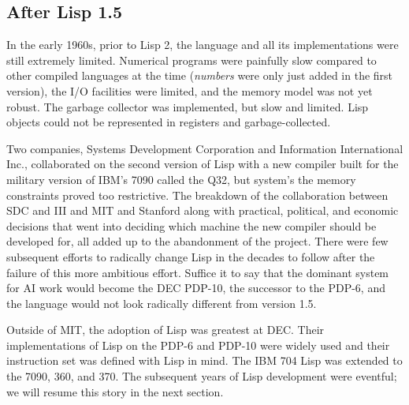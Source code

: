 \subsection{After Lisp 1.5}

In the early 1960s, prior to Lisp 2, the language and all its implementations were still
extremely limited.
Numerical programs were painfully slow compared to other compiled languages at
the time (\textit{numbers} were only just added in the first version), the I/O
facilities were limited, and the memory model was not yet robust.
The garbage collector was implemented, but slow and limited.
Lisp objects could not be represented in registers and garbage-collected.

Two companies, Systems Development Corporation and Information International Inc.,
collaborated on the second version of Lisp with a new compiler
built for the military version of IBM's 7090 called the Q32, but system's the memory constraints
proved too restrictive.
The breakdown of the collaboration between SDC and III and MIT and Stanford along
with practical, political, and economic decisions that went into deciding which machine
the new compiler should be developed for, all added up to the abandonment of the project.
There were few subsequent efforts to radically change Lisp in the decades to follow
after the failure of this more ambitious effort.
Suffice it to say that the dominant system for AI work would become the DEC PDP-10, the
successor to the PDP-6, and the language would not look radically different from
version 1.5.

Outside of MIT, the adoption of Lisp was greatest at DEC.
Their implementations of Lisp on the PDP-6 and PDP-10 were widely used and their
instruction set was defined with Lisp in mind\cite{mccarthy_history_of_lisp_1978}.
The IBM 704 Lisp was extended to the 7090, 360, and 370.
The subsequent years of Lisp development were eventful; we will resume
this story in the next section.

